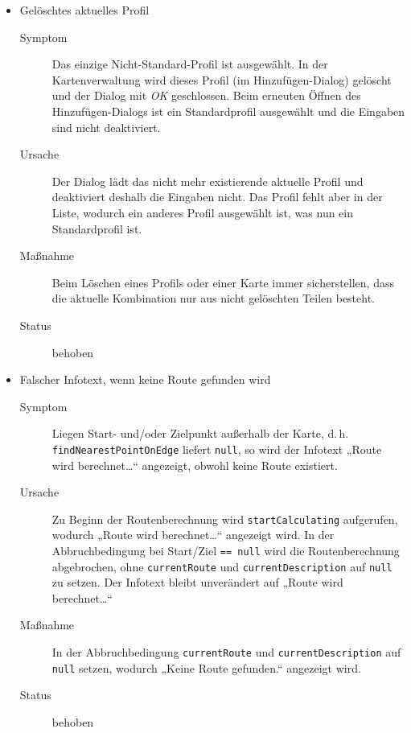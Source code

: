 \documentclass[a4paper, 11pt]{article}
\makeatletter
\def\namedlabel#1#2{\begingroup
    #2%
    \def\@currentlabel{#2}%
    \phantomsection\label{#1}\endgroup
}
\newcommand{\oitem}[2]{
  \@ifundefined{c@oitem#1}{\newcounter{oitem#1}}{} %
  \addtocounter{oitem#1}{10}
  \item[\namedlabel{#1:#2}{/#1\arabic{oitem#1}/}]
}
\newcommand{\bug}[6]{%
  \oitem{BG}{#1}
  	#2
    \begin{description}
    \item[Symptom] #3
    \item[Ursache] #4
    \item[Maßnahme] #5
    \item[Status] #6
    \end{description}
}
\newcommand{\code}[1]{\texttt{#1}}
\makeatother
\begin{document}
\begin{itemize}
{    Jetzt wird dieses Profil im Dialog für das Hinzufügen neuer Profile gelöscht.
    Das Profil ist weiterhin in der Liste der Karte vorhanden.}
    {Beim Beenden des Dialogs werden gelöschte Profile nicht richtig erkannt und verarbeitet.}
    {Weiteren Code hinzufügen, der alle gelöschten Profile ermittelt und sie direkt aus den Listen löscht.}
    {behoben}
\bug{currentProfileNotExisting}{Gelöschtes aktuelles Profil}
    {Das einzige Nicht-Standard-Profil ist ausgewählt. In der Kartenverwaltung wird dieses Profil (im Hinzufügen-Dialog) gelöscht und der Dialog mit \textit{OK} geschlossen.
    Beim erneuten Öffnen des Hinzufügen-Dialogs ist ein Standardprofil ausgewählt und die Eingaben sind nicht deaktiviert.}
    {Der Dialog lädt das nicht mehr existierende aktuelle Profil und deaktiviert deshalb die Eingaben nicht.
    Das Profil fehlt aber in der Liste, wodurch ein anderes Profil ausgewählt ist, was nun ein Standardprofil ist.}
    {Beim Löschen eines Profils oder einer Karte immer sicherstellen, dass die aktuelle Kombination nur aus nicht gelöschten Teilen besteht.}
    {behoben}
\bug{noRouteWirdBerechnet}{Falscher Infotext, wenn keine Route gefunden wird}
	{Liegen Start- und/oder Zielpunkt außerhalb der Karte,
	d.\,h. \code{find\-Nearest\-Point\-On\-Edge} liefert \code{null},
	so wird der Infotext „Route wird berechnet\dots“ angezeigt, obwohl keine Route existiert.}
	{Zu Beginn der Routenberechnung wird \code{startCalculating} aufgerufen, wodurch „Route wird berechnet\dots“ angezeigt wird.
	In der Abbruchbedingung bei Start/Ziel \code{== null} wird die Routenberechnung abgebrochen,
	ohne \code{currentRoute} und \code{currentDescription} auf \code{null} zu setzen.
	Der Infotext bleibt unverändert auf „Route wird berechnet\dots“}
	{In der Abbruchbedingung \code{currentRoute} und \code{currentDescription} auf \code{null} setzen, wodurch „Keine Route gefunden.“ angezeigt wird.}
	{behoben}
\end{itemize}
\end{document}
